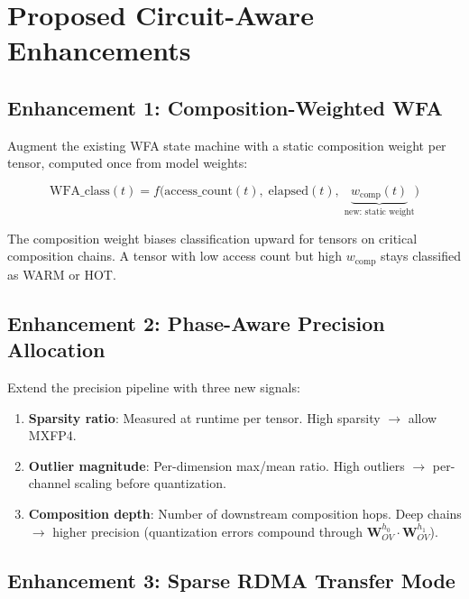 \documentclass[11pt,letterpaper]{article}
\begin{document}
\section{Proposed Circuit-Aware Enhancements}
\label{sec:proposals}

\subsection{Enhancement 1: Composition-Weighted WFA}

Augment the existing WFA state machine with a static composition weight per tensor, computed once from model weights:

\begin{equation}
    \text{WFA\_class}(t) = f\big(\text{access\_count}(t),\; \text{elapsed}(t),\; \underbrace{w_{\text{comp}}(t)}_{\text{new: static weight}}\big)
\end{equation}

The composition weight biases classification upward for tensors on critical composition chains. A tensor with low access count but high $w_{\text{comp}}$ stays classified as WARM or HOT.

\subsection{Enhancement 2: Phase-Aware Precision Allocation}

Extend the precision pipeline with three new signals:

\begin{enumerate}
    \item \textbf{Sparsity ratio}: Measured at runtime per tensor. High sparsity $\to$ allow MXFP4.
    \item \textbf{Outlier magnitude}: Per-dimension max/mean ratio. High outliers $\to$ per-channel scaling before quantization.
    \item \textbf{Composition depth}: Number of downstream composition hops. Deep chains $\to$ higher precision (quantization errors compound through $\mathbf{W}_{OV}^{h_0} \cdot \mathbf{W}_{OV}^{h_1}$).
\end{enumerate}

\subsection{Enhancement 3: Sparse RDMA Transfer Mode}
\end{document}
